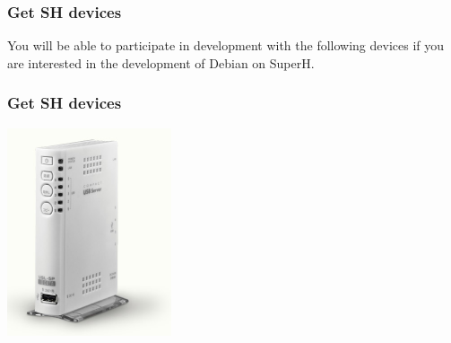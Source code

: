 \documentclass[cjk,dvipdfm,12pt]{beamer}
\begin{document}
\begin{frame}
 \frametitle{Get SH devices}
You will be able to participate in development with the following devices if you are interested in the development of Debian on SuperH. 

\end{frame}



\begin{frame}
 \frametitle{Get SH devices}
 \begin{minipage}[t]{0.3\hsize}
  \includegraphics[width=1.0\hsize]{image200705/usl5p.png}
 \end{minipage} 
 \begin{minipage}[t]{0.3\hsize}

\end{minipage}
\end{frame}
\end{document}
